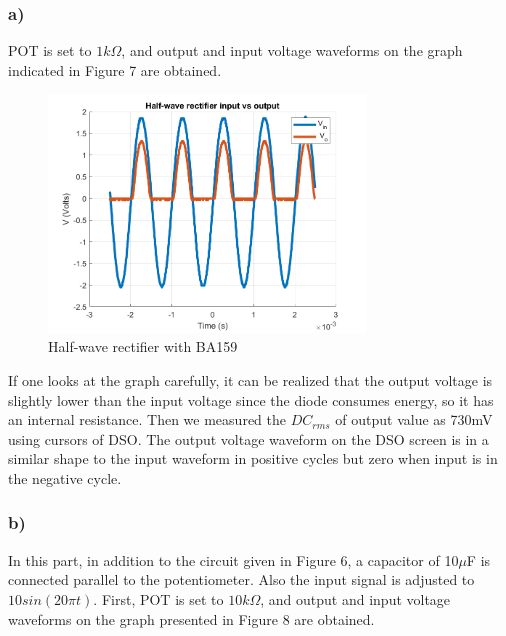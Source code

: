 \documentclass[letterpaper,12pt]{article}
\begin{document}
\subsubsection{a)}

POT is set to \(1k\Omega\), and output and input voltage waveforms on the graph indicated in Figure 7 are obtained.

\begin{figure}[H]
    \centering
    \includegraphics[width = 0.75\textwidth]{2_a.png}
    \caption{Half-wave rectifier with BA159}
\end{figure} 



If one looks at the graph carefully, it can be realized that the output voltage is slightly lower than the input voltage since the diode consumes energy, so it has an internal resistance. Then we measured the \(DC_{rms} \) of output value as 730mV using cursors of DSO. The output voltage waveform on the DSO screen is in a similar shape to the input waveform in positive cycles but zero when input is in the negative cycle.  


\subsubsection{b)}
In this part, in addition to the circuit given in Figure 6, a capacitor of 10\(\mu\)F is connected parallel to the potentiometer. Also the input signal is adjusted to \(10 sin(20 \pi t) \). First, POT is set to \(10k\Omega\), and output and input voltage waveforms on the graph presented in Figure 8 are obtained.
\end{document}
